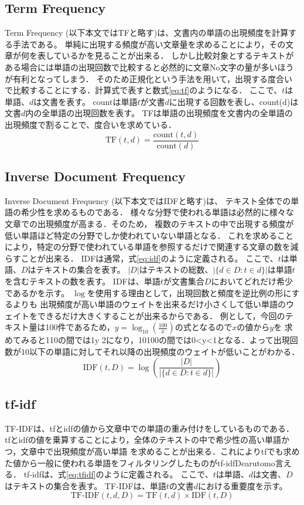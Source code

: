 \documentclass[a4paper,11pt]{ltjsarticle}
\begin{document}
\subsection{Term Frequency}
Term Frequency (以下本文ではTFと略す)は、文書内の単語の出現頻度を計算する手法である。
単純に出現する頻度が高い文章量を求めることにより，その文章が何を表しているかを見ることが出来る．
しかし比較対象とするテキストがある場合には単語の出現回数で比較すると必然的に文章No文字の量が多いほうが有利となってしまう．
そのため正規化という手法を用いて，出現する度合いで比較することにする．計算式で表すと数式\eqref{eq:tf}のようになる．
ここで、$t$は単語、$d$は文書を表す。
countは単語$t$が文書$d$に出現する回数を表し、count(d)は文書$d$内の全単語の出現回数を表す。
TFは単語の出現頻度を文書内の全単語の出現頻度で割ることで、度合いを求めている．
\begin{equation}
    \label{eq:tf}
    \text{TF}(t, d) = \frac{\text{count}(t, d)}{\text{count}(d)}
\end{equation}
\subsection{Inverse Document Frequency}
Inverse Document Frequency (以下本文ではIDFと略す)は、
テキスト全体での単語の希少性を求めるものである．
様々な分野で使われる単語は必然的に様々な文章での出現頻度が高まる．そのため，
複数のテキストの中で出現する頻度が低い単語ほど特定の分野でしか使われていない単語となる．
これを求めることにより，特定の分野で使われている単語を参照するだけで関連する文章の数を減らすことが出来る．
IDFは通常，式\eqref{eq:idf}のように定義される。
ここで、$t$は単語、$D$はテキストの集合を表す。
$|D|$はテキストの総数、$|\{d \in D : t \in d\}|$は単語$t$を含むテキストの数を表す。
IDFは、単語$t$が文書集合$D$においてどれだけ希少であるかを示す。
$\log$を使用する理由として，出現回数と頻度を逆比例の形にするよりも
出現頻度が高い単語のウェイトを出来るだけ小さくして低い単語のウェイトをできるだけ大きくすることが出来るからである．
例として，今回のテキスト量は100件であるため，$y = \log_{10}(\frac{100}{x})$の式となるので$x$の値から$y$を
求めてみると1\thicksim 10の間では1\leqq y \leqq 2になり，10\thicksim 100の間では0<y<1となる．よって出現回数が10以下の単語に対してそれ以降の出現頻度のウェイトが低いことがわかる．
\begin{equation}
    \label{eq:idf}
    \text{IDF}(t, D) = \log\left(\frac{|D|}{|\{d \in D : t \in d\}|}\right)
\end{equation}
\subsection{tf-idf}
TF-IDFは、tfとidfの値から文章中での単語の重み付けをしているものである．
tfとidfの値を乗算することにより，全体のテキストの中で希少性の高い単語かつ，文章中で出現頻度が高い単語
を求めることが出来る．これによりtfでも求めた値から一般に使われる単語をフィルタリングしたものがtf-idfDearutomo言える．
tf-idfは、式\eqref{eq:tfidf}のように定義される。
ここで、$t$は単語、$d$は文書、$D$はテキストの集合を表す。
TF-IDFは、単語$t$の文書$d$における重要度を示す。
\begin{equation}
    \label{eq:tfidf}
    \text{TF-IDF}(t, d, D) = \text{TF}(t, d) \times \text{IDF}(t, D)
\end{equation}
\end{document}
